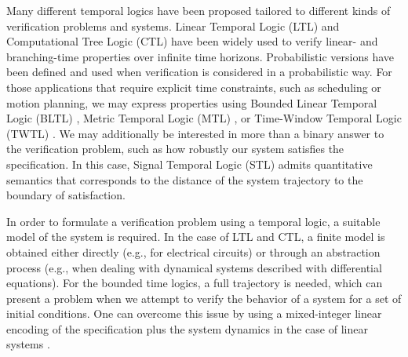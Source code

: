 \documentclass[letterpaper, 10 pt, conference]{ieeeconf/ieeeconf}
\begin{document}

Many different temporal logics have been proposed tailored to
different kinds of verification problems and systems. Linear Temporal Logic
(LTL) \cite{gerth_simple_1996} and Computational Tree Logic (CTL)
\cite{clarke_automatic_1986} have been widely used to verify
linear- and branching-time properties over infinite time horizons. Probabilistic
versions have been defined and used when verification is considered in a
probabilistic way. For those applications that require explicit time
constraints, such as scheduling or motion planning, we may express properties
using Bounded Linear Temporal Logic (BLTL) \cite{jha_bayesian_2009}, Metric
Temporal Logic (MTL) \cite{luo_using_2016}, 
or Time-Window Temporal Logic (TWTL) \cite{AkVaBe-ICRA-2016}. We may additionally be interested in more
than a binary answer to the verification problem, such as how robustly our
system satisfies the specification. In this case, Signal Temporal Logic (STL)
\cite{donze_robust_2010}
admits quantitative semantics that corresponds to the distance of the system
trajectory to the boundary of satisfaction.

In order to formulate a verification problem using a temporal logic, a suitable
model of the system is required. In the case of LTL and CTL, a finite model is
obtained either directly (e.g., for electrical circuits) or through
an abstraction process (e.g., when dealing with dynamical systems described with
differential equations). For the bounded time logics, a full trajectory is
needed, which can present a problem when we attempt to verify the behavior of a
system for a set of initial conditions. One can overcome this issue by using 
a mixed-integer linear encoding of the specification plus the system dynamics in
the case of linear systems \cite{sadraddini_robust_2015}.
\end{document}

